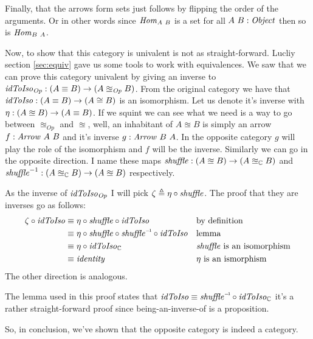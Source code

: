 Finally, that the arrows form sets just follows by flipping the order of the
arguments. Or in other words since $\mathit{Hom}_{A\ B}$ is a set for all $A\ B \mathrel{:}
\mathit{Object}$ then so is $\mathit{Hom}_{B\ A}$.

Now, to show that this category is univalent is not as straight-forward. Lucliy
section \ref{sec:equiv} gave us some tools to work with equivalences.
We saw that we
can prove this category univalent by giving an inverse to
$\mathit{idToIso}_{\mathit{Op}} \mathrel{:} (A \equiv B) \to (A \approxeq_{\mathit{Op}} B)$.
From the original category we have that $\mathit{idToIso} \mathrel{:} (A \equiv B) \to (A \cong
B)$ is an isomorphism. Let us denote it's inverse with $\eta \mathrel{:} (A \approxeq B)
\to (A \equiv B)$. If we squint we can see what we need is a way to go between
$\approxeq_{\mathit{Op}}$ and $\approxeq$, well, an inhabitant of $A \approxeq
B$ is simply an arrow $f \mathrel{:} \mathit{Arrow}\ A\ B$ and it's inverse $g \mathrel{:}
\mathit{Arrow}\ B\ A$. In the opposite category $g$ will play the role of the
isomorphism and $f$ will be the inverse. Similarly we can go in the opposite
direction. I name these maps $\mathit{shuffle} \mathrel{:} (A \approxeq B) \to (A
\approxeq_{\mathbb{C}} B)$ and $\mathit{shuffle}^{-1} \mathrel{:} (A \approxeq_{\mathbb{C}} B) \to (A
\approxeq B)$ respectively.

As the inverse of $\mathit{idToIso}_{\mathit{Op}}$ I will pick $\zeta \mathrel{\triangleq} \eta \circ
\mathit{shuffle}$. The proof that they are inverses go as follows:
%
\begin{align*}
\zeta \comp \idToIso & \equiv
\eta \comp \shuffle \comp \idToIso
&& \text{by definition} \\
%
& \equiv
\eta \comp \shuffle \comp \inv{\shuffle} \comp \idToIso
&& \text{lemma} \\
& \equiv
\eta \comp \idToIso_{\bC}
&& \text{$\shuffle$ is an isomorphism} \\
& \equiv
\identity
&& \text{$\eta$ is an ismorphism}
\end{align*}
%
The other direction is analogous.

The lemma used in this proof states that $\idToIso \equiv \inv{\shuffle} \comp
\idToIso_{\bC}$ it's a rather straight-forward proof since being-an-inverse-of
is a proposition.

So, in conclusion, we've shown that the opposite category is indeed a category.

